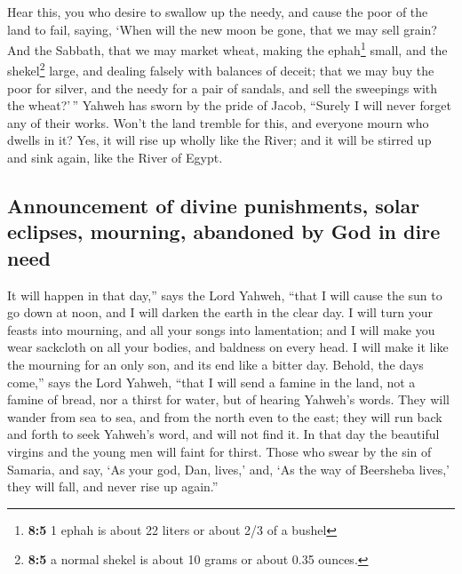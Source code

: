 \begin{paracol}{2}
\begin{otherlanguage}{english}
 Hear this, you who desire to swallow up the needy, and
cause the poor of the land to fail,  saying, `When will
the new moon be gone, that we may sell grain? And the Sabbath, that we
may market wheat, making the ephah\footnote{\textbf{8:5} 1 ephah is
  about 22 liters or about 2/3 of a bushel} small, and the
shekel\footnote{\textbf{8:5} a normal shekel is about 10 grams or about
  0.35 ounces.} large, and dealing falsely with balances of deceit;
 that we may buy the poor for silver, and the needy for a
pair of sandals, and sell the sweepings with the wheat?'\,''
 Yahweh has sworn by the pride of Jacob, ``Surely I will
never forget any of their works.  Won't the land tremble
for this, and everyone mourn who dwells in it? Yes, it will rise up
wholly like the River; and it will be stirred up and sink again, like
the River of Egypt.

\hypertarget{announcement-of-divine-punishments-solar-eclipses-mourning-abandoned-by-god-in-dire-need}{%
\subsection{Announcement of divine punishments, solar eclipses,
mourning, abandoned by God in dire
need}\label{announcement-of-divine-punishments-solar-eclipses-mourning-abandoned-by-god-in-dire-need}}

 It will happen in that day,'' says the Lord Yahweh,
``that I will cause the sun to go down at noon, and I will darken the
earth in the clear day.  I will turn your feasts into
mourning, and all your songs into lamentation; and I will make you wear
sackcloth on all your bodies, and baldness on every head. I will make it
like the mourning for an only son, and its end like a bitter day.
 Behold, the days come,'' says the Lord Yahweh, ``that I
will send a famine in the land, not a famine of bread, nor a thirst for
water, but of hearing Yahweh's words.  They will wander
from sea to sea, and from the north even to the east; they will run back
and forth to seek Yahweh's word, and will not find it. 
In that day the beautiful virgins and the young men will faint for
thirst.  Those who swear by the sin of Samaria, and say,
`As your god, Dan, lives,' and, `As the way of Beersheba lives,' they
will fall, and never rise up again.''

\end{otherlanguage}


\end{paracol}
